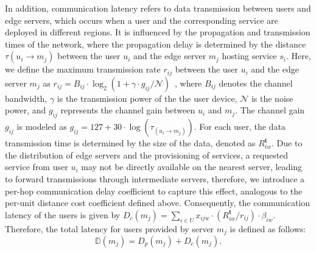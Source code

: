 \documentclass[10pt, conference, letterpaper]{IEEEtran}
\begin{document}
In addition, communication latency refers to data transmission between users and edge servers, which occurs when a user and the corresponding service are deployed in different regions. It is influenced by the propagation and transmission times of the network, where the propagation delay is determined by the distance $\tau(u_i \rightarrow m_j)$ between the user $u_i$ and the edge server $m_j$ hosting service $s_i$. Here, we define the maximum transmission rate $r_{ij}$ between the user $u_i$ and the edge server $m_j$ as $r_{ij} = B_{ij} \cdot \log_2 \left( 1 + {\gamma \cdot g_{ij}}/{\mathcal{N}} \right)$~\cite{b28,b31, b32}, where $B_{ij}$ denotes the channel bandwidth, $\gamma$ is the transmission power of the the user device, $\mathcal{N}$ is the noise power, and $g_{ij}$ represents the channel gain between $u_i$ and $m_j$. The channel gain $g_{ij}$ is modeled as $g_{ij} = 127 + 30 \cdot \log \left( \tau_{(u_i \rightarrow m_j)} \right)$. For each user, the data transmission time is determined by the size of the data, denoted as $R^{\textbf{t}}_{iw}$. Due to the distribution of edge servers and the provisioning of services, a requested service from user $u_i$ may not be directly available on the nearest server, leading to forward transmissions through intermediate servers, therefore, we introduce a per-hop communication delay coefficient to capture this effect, analogous to the per-unit distance cost coefficient defined above. Consequently, the communication latency of the users is given by $D_{c}(m_j) = \sum_{i \in U} x_{ijw} \cdot ({R^{\textbf{t}}_{iw}}/{r_{ij}}) \cdot \beta_{iw}$. 
Therefore, the total latency for users provided by server $m_j$ is defined as follows: 
\begin{equation}
	\mathbb{D}(m_j) = D_{p}(m_j) + D_{c}(m_j).
	\label{eq2}
\end{equation}
\end{document}
